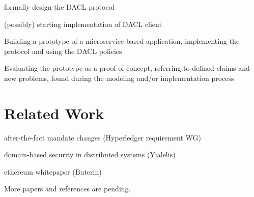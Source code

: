 \documentclass[12pt, conference]{IEEEtran}
\begin{document}
\begin{list}{-}{ }
\item formally design the DACL protocol
\item (possibly) starting implementation of DACL client
\item Building a prototype of a microservice based application, implementing the protocol and using the DACL policies
\item Evaluating the prototype as a proof-of-concept, referring to defined claims and new problems, found during the modeling and/or implementation process
\end{list}


\section*{Related Work}



\begin{list}{-}{}
\item after-the-fact mandate changes (Hyperledger requirement WG)
\item domain-based security in distributed systems (Yialelis)
\item ethereum whitepaper (Buterin)
\item 
\end{list}

More papers and references are pending. 



\end{document}
